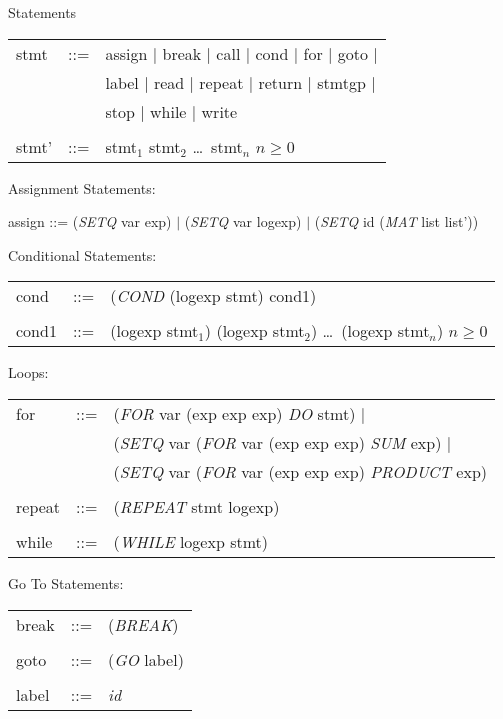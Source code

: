 \begin{describe}{Statements}
\begin{tabular}{lll}
stmt & ::= &  assign  $\mid$  break  $\mid$  call  $\mid$  cond  $\mid$  for  $\mid$  goto $\mid$\\
& & label  $\mid$  read  $\mid$  repeat  $\mid$  return  $\mid$  stmtgp $\mid$\\
& & stop  $\mid$  while  $\mid$  write \\
& &\\
stmt' &  ::= & stmt$_1$ stmt$_2$ \dots\  stmt$_n$   $n \geq 0$\\
\end{tabular}

Assignment Statements:

assign  ::=  ({\it SETQ\/} var exp)  $\mid$  ({\it SETQ\/} var logexp) $\mid$
             ({\it SETQ\/} id ({\it MAT\/} list list'))

Conditional Statements:

\begin{tabular}{lll}
cond & ::= & ({\it COND\/} (logexp stmt) cond1)\\
& & \\
cond1 & ::= &  (logexp stmt$_1$) (logexp stmt$_2$) \dots\  (logexp stmt$_n$)  $n \geq 0$\\
\end{tabular}

Loops:

\begin{tabular}{lll}
for & ::= & ({\it FOR\/} var (exp exp exp) {\it DO\/} stmt) $\mid$\\
& &  ({\it SETQ\/} var ({\it FOR\/} var (exp exp exp) {\it SUM\/} exp) $\mid$\\
& & ({\it SETQ\/} var ({\it FOR\/} var (exp exp exp) {\it PRODUCT\/} exp)\\
& &\\
repeat & ::= & ({\it REPEAT\/} stmt logexp)\\
& &\\
while & ::= & ({\it WHILE\/} logexp stmt)
\end{tabular}

Go To Statements:

\begin{tabular}{lll} 
break & ::= & ({\it BREAK\/})\\
& & \\
goto & ::= & ({\it GO\/} label)\\
& & \\
label & ::= & {\it id}\\
\end{tabular}


\end{describe}
